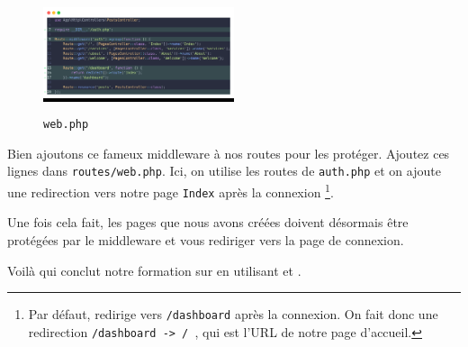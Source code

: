 \begin{figure}
    \colorbox{black}{\includegraphics[width=0.5\textwidth]{figures-C1/middleware_web.png}}
    \caption{\texttt{web.php}}
\end{figure}

Bien ajoutons ce fameux middleware à nos routes pour les protéger. Ajoutez ces lignes dans \texttt{routes/web.php}. Ici, on utilise les routes de \texttt{auth.php} et on ajoute une redirection  vers notre page \texttt{Index} après la connexion \footnote{Par défaut, \laravel redirige vers \texttt{/dashboard} après la connexion. On fait donc une redirection \newline  \texttt{/dashboard -> / }, qui est l'URL de notre page d'accueil.}.

Une fois cela fait, les pages que nous avons créées doivent désormais être protégées par le middleware et vous rediriger vers la page de connexion.

Voilà qui conclut notre formation sur \laravel en utilisant \inertia{} et \react.

\newpage


